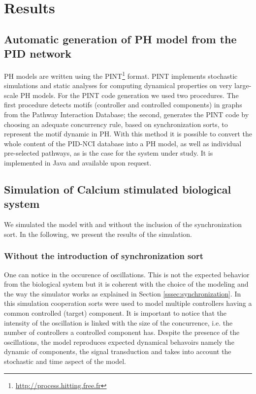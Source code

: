 
\section{Results}

\subsection{Automatic generation of PH model from the PID network}

PH models are written using the PINT\footnote{\url{http://process.hitting.free.fr}} format.  
PINT implements stochastic simulations and static analyses for computing dynamical properties on very large-scale PH models.
For the PINT code generation we used two procedures.
The first procedure detects motifs (controller and controlled components) in graphs from the Pathway Interaction Database; the second, 
generates the PINT code by choosing an adequate concurrency rule, based on synchronization sorts, to represent the motif dynamic in PH.
With this method it is possible to convert the whole content of the PID-NCI database into a PH model, as well as individual pre-selected pathways, 
as is the case for the system under study.  It is implemented in Java and available upon request.




\subsection{Simulation of Calcium stimulated biological system}

We simulated the model with and without the inclusion of the synchronization sort. In the following, we present the results of 
the simulation.

\subsubsection{Without the introduction of synchronization sort}
One can notice in  the occurence of oscillations. This is not the expected behavior from the biological system
but it is coherent with the choice of the modeling and the way the simulator works as explained in Section \ref{sssec:synchronization}.
In this simulation cooperation sorts were used to model multiple controllers having a common controlled (target) component.
It is important to notice that the intensity of the oscillation is linked with 
the size of the concurrence, i.e. the number of controllers a controlled component has.
Despite the presence of the oscillations, the model reproduces expected dynamical behavoirs  namely
the dynamic of components, the signal transduction and takes into account the stochastic and time aspect of the model.

